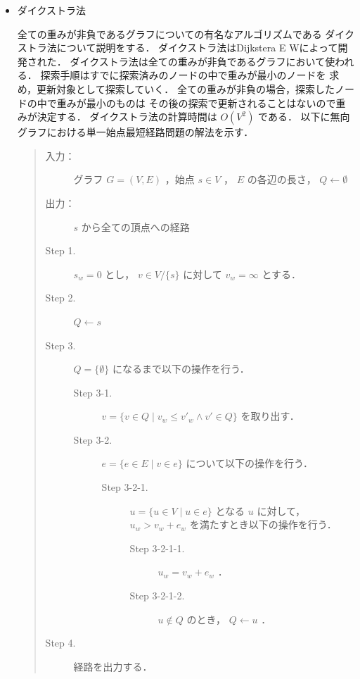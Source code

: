\documentclass[12pt]{optlab-bachelor}
\begin{document}
\begin{itemize}
  \item ダイクストラ法

  全ての重みが非負であるグラフについての有名なアルゴリズムである
  ダイクストラ法について説明をする．
  ダイクストラ法はDijkstera E W\cite{Dijkstera}によって開発された．
  ダイクストラ法は全ての重みが非負であるグラフにおいて使われる．
  探索手順はすでに探索済みのノードの中で重みが最小のノードを
  求め，更新対象として探索していく．
  全ての重みが非負の場合，探索したノードの中で重みが最小のものは
  その後の探索で更新されることはないので重みが決定する．
  ダイクストラ法の計算時間は $O(V^2)$ である．
  以下に無向グラフにおける単一始点最短経路問題の解法を示す．

  \begin{quote}
    \begin{description}
      \item[入力：] グラフ $G=(V,E)$ ，始点 $s \in V$ ， $E$ の各辺の長さ， $Q \leftarrow \emptyset$
      \item[出力：] $s$ から全ての頂点への経路
      \item[Step 1.] $s_w = 0$ とし， $v \in V/ \{ s\}$ に対して $v_w = \infty$ とする．
      \item[Step 2.] $Q \leftarrow s$
      \item[Step 3.] $Q = \{\emptyset\}$ になるまで以下の操作を行う．
      \begin{description}
        \item[Step 3-1.] $v = \{ v \in Q \mid v_w \leq v'_w \land v' \in Q \}$ を取り出す．
        \item[Step 3-2.] $e = \{ e \in E \mid v \in e \}$ について以下の操作を行う．
        \begin{description}
          \item[Step 3-2-1.] $u = \{ u \in V \mid u \in e\}$ となる $u$ に対して，
          $u_w > v_w + e_w$ を満たすとき以下の操作を行う．

          \begin{description}
            \item[Step 3-2-1-1.] $u_w = v_w + e_w$ ．
            \item[Step 3-2-1-2.] $u \notin Q$ のとき， $Q \leftarrow u$ ．
          \end{description}
        \end{description}
      \end{description}

      \item[Step 4.] 経路を出力する．
    \end{description}
  \end{quote}
\end{itemize}
\end{document}
